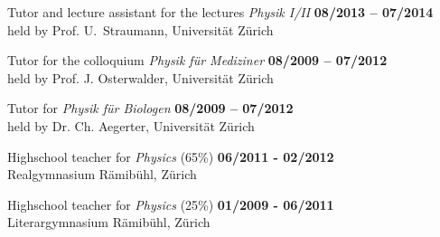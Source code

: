 \documentclass[margin,line]{resume}
\begin{document}
\begin{resume}
\begin{list2}
  \item Tutor and lecture assistant for the lectures \emph{Physik I/II}
    \hfill {\bf 08/2013 -- 07/2014} \\
    {\small
      held by Prof. U.~Straumann, 
      Universität Zürich
    }

  \item Tutor for the colloquium \emph{Physik für Mediziner}
    \hfill {\bf 08/2009 -- 07/2012} \\
    {\small
      held by Prof. J. Osterwalder, 
      Universität Zürich
    }

  \item Tutor for \emph{Physik für Biologen}
    \hfill {\bf 08/2009 -- 07/2012} \\
    {\small
      held by Dr. Ch. Aegerter,
      Universität Zürich
    }

  \item Highschool teacher for \emph{Physics} (65\%)
    \hfill {\bf 06/2011 - 02/2012}\\
    {\small
      Realgymnasium Rämibühl, Zürich
    }

  \item Highschool teacher for \emph{Physics} (25\%)
    \hfill {\bf 01/2009 - 06/2011}\\
    {\small
      Literargymnasium Rämibühl, Zürich
    }

\end{list2}




\end{resume}
\end{document}
